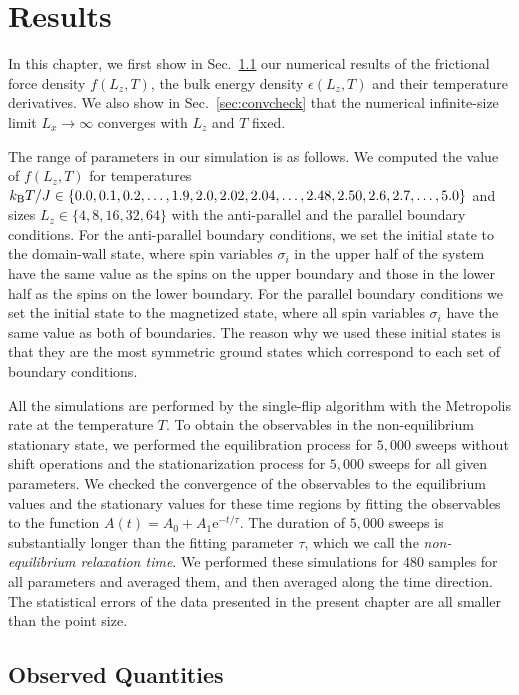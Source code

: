 \chapter{Results}\label{chap:Res}

In this chapter, we first show in Sec.~\ref{sec:NEMCs} our numerical results of the frictional force density $f(L_{z}, T)$, the bulk energy density $\epsilon(L_{z}, T)$ and their temperature derivatives. We also show in Sec.~\ref{sec:convcheck} that the numerical infinite-size limit $L_{x}\to\infty$ converges with $L_{z}$ and $T$ fixed.

The range of parameters in our simulation is as follows. We computed the value of $f(L_{z}, T)$ for temperatures $k_{\rm B}T/J\in\{0.0,0.1,0.2,\dots,1.9,2.0,2.02,2.04,\dots,2.48,2.50,2.6,2.7,\dots,5.0\}$ and sizes $L_{z}\in\{4,8,16,32,64\}$ with the anti-parallel and the parallel boundary conditions. For the anti-parallel boundary conditions, we set the initial state to the domain-wall state, where spin variables $\sigma_{i}$ in the upper half of the system have the same value as the spins on the upper boundary and those in the lower half as the spins on the lower boundary. For the parallel boundary conditions we set the initial state to the magnetized state, where all spin variables $\sigma_{i}$ have the same value as both of boundaries. The reason why we used these initial states is that they are the most symmetric ground states which correspond to each set of boundary conditions.

All the simulations are performed by the single-flip algorithm with the Metropolis rate at the temperature $T$. To obtain the observables in the non-equilibrium stationary state, we performed the equilibration process for $5{,}000$ sweeps without shift operations and the stationarization process for $5{,}000$ sweeps for all given parameters. We checked the convergence of the observables to the equilibrium values and the stationary values for these time regions by fitting the observables to the function $A(t)=A_{0} + A_{1}\mathrm{e}^{-t/\tau}$. The duration of $5{,}000$ sweeps is substantially longer than the fitting parameter $\tau$, which we call the \textit{non-equilibrium relaxation time}. We performed these simulations for $480$ samples for all parameters and averaged them, and then averaged along the time direction. The statistical errors of the data presented in the present chapter are all smaller than the point size.

\section{Observed Quantities}\label{sec:NEMCs}

